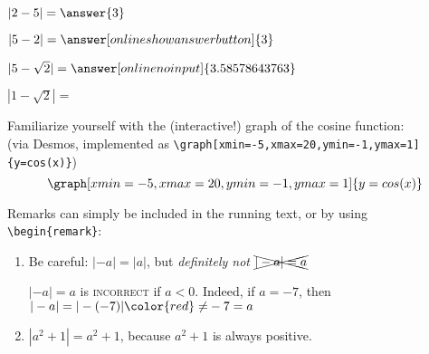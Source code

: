 \documentclass{ximera}
\begin{document}
\begin{exercise}\nl 

    \begin{xmmulticols}
    \begin{question} $|2-5|        = \answer{3}$                            \end{question}
    \begin{question} $|5-2|        = \answer[onlineshowanswerbutton]{3}$    \end{question}
    \begin{question} $|5-\sqrt{2}| = \answer[onlinenoinput]{3.58578643763}$ \end{question}
    \begin{question} 
        $|1-\sqrt{2}| = $
    \end{question}
    \end{xmmulticols}
\end{exercise}

Familiarize yourself with the (interactive!) graph of the cosine function:  \\
(via Desmos, implemented as \verb|\graph[xmin=-5,xmax=20,ymin=-1,ymax=1]{y=cos(x)}|)
\[  
\graph[xmin=-5,xmax=20,ymin=-1,ymax=1]{y=cos(x)}  
\] 

Remarks can simply be included in the running text, or by using \verb|\begin{remark}|:

\begin{remark} \nl
		\begin{enumerate}
			\item Be careful: $|-a|= |a|$, but \textit{definitely not} $\xcancel{|-a|=a}$

			$|-a|=a$ is \textsc{incorrect} if $a<0$. Indeed, if $a=-7$, then $|-a| = |-(-7)| {\color{red}\neq} -7 = a$
			\item $|a^2 + 1| = a^2 + 1$, because $a^2+1$ is always positive.
\end{enumerate}
\end{remark}
\end{document}
